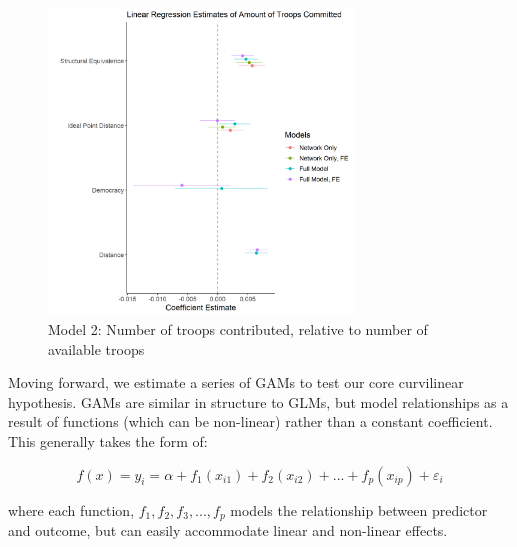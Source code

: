 \documentclass[12pt,letterpaper]{article}
\begin{document}
	\begin{figure}[H]
		\centering
		\includegraphics[width=0.725\textwidth]{figures/linear_coef.png}
		\caption{Model 2: Number of troops contributed, relative to number of available troops}
		\label{fig:linear_reg}
	\end{figure}
	
	Moving forward, we estimate a series of GAMs to test our core curvilinear hypothesis. GAMs are similar in structure to GLMs, but model relationships as a result of functions (which can be non-linear) rather than a constant coefficient. This generally takes the form of:
	
	\begin{equation*}
	f(x) = y_i = \alpha + f_1(x_{i1}) + f_2(x_{i2}) + ... + f_p(x_{ip}) + \varepsilon_i
	\end{equation*}
	
	where each function, $f_1, f_2, f_3, ..., f_p$ models the relationship between predictor and outcome, but can easily accommodate linear and non-linear effects.
	
\end{document}
